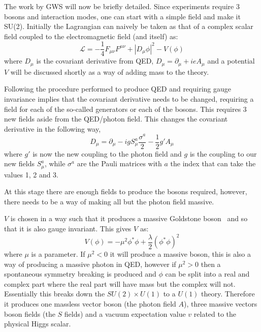 The work by GWS will now be briefly detailed. Since experiments require 3 bosons and interaction modes, one can start with a simple field and make it SU(2). Initially the Lagrangian can naively be taken as that of a complex scalar field coupled to the electromagnetic field (and itself) as:
\begin{equation}
\mathcal{L} = - \frac{1}{4} F_{\mu\nu}F^{\mu\nu} + |D_\mu \phi |^2  -V(\phi)
\end{equation}
where $D_\mu$ is the covariant derivative from QED, $D_\mu = \partial_\mu +ieA_\mu$ and a potential $V$ will be discussed shortly as a way of adding mass to the theory.

Following the procedure performed to produce QED and requiring gauge invariance implies that the covariant derivative needs to be changed, requiring a field for each of the so-called generators or each of the bosons. This requires 3 new fields aside from the QED/photon field. This changes the covariant derivative in the following way,
\begin{equation}
D_\mu = \partial_\mu - ig S^a_\mu \frac{\sigma^a}{2} - \frac{1}{2}g' A_\mu
\end{equation}
where $g'$ is now the new coupling to the photon field and $g$ is the coupling to our new fields $S^a_\mu$, while $\sigma^a$ are the Pauli matrices with $a$ the index that can take the values 1, 2 and 3.

At this stage there are enough fields to produce the bosons required, however, there needs to be a way of making all but the photon field massive.

$V$ is chosen in a way such that it produces a massive Goldstone boson~\cite{80Goldstone} and so that it is also gauge invariant. This gives $V$ as:
\begin{equation}
V(\phi) = - \mu^2 \phi^{*}\phi + \frac{\lambda}{2}(\phi^{*}\phi)^2
\end{equation}
where $\mu$ is a parameter.
If $\mu^2 <0$ it will produce a massive boson, this is also a way of producing a massive photon in QED, however if $\mu^2 >0$ then a spontaneous symmetry breaking is produced and $\phi$ can be split into a real and complex part where the real part will have mass but the complex will not. Essentially this breaks down the $SU(2) \times U(1)$ to a $U(1)$ theory. Therefore it produces one massless vector boson (the photon field $A$), three massive vectors boson fields (the $S$ fields) and a vacuum expectation value $v$ related to the physical Higgs scalar.

